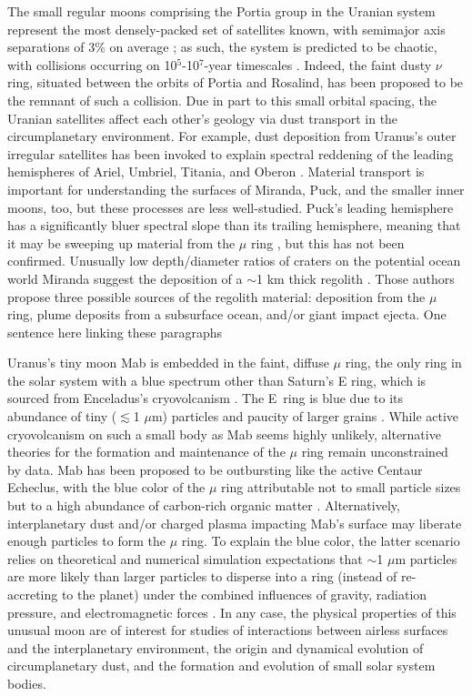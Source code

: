 \documentclass[preprint]{aastex631}
\begin{document}
The small regular moons comprising the Portia group in the Uranian system represent the most densely-packed set of satellites known, with semimajor axis separations of 3\% on average \citep{showalter20}; as such, the system is predicted to be chaotic, with collisions occurring on 10$^5$-10$^7$-year timescales \citep{duncan97, french12}. Indeed, the faint dusty $\nu$ ring, situated between the orbits of Portia and Rosalind, has been proposed to be the remnant of such a collision. Due in part to this small orbital spacing, the Uranian satellites affect each other's geology via dust transport in the circumplanetary environment. For example, dust deposition from Uranus's outer irregular satellites has been invoked to explain spectral reddening of the leading hemispheres of Ariel, Umbriel, Titania, and Oberon \citep{cartwright18}. Material transport is important for understanding the surfaces of Miranda, Puck, and the smaller inner moons, too, but these processes are less well-studied. 
Puck's leading hemisphere has a significantly bluer spectral slope than its trailing hemisphere, meaning that it may be sweeping up material from the $\mu$ ring \citep{french17}, but this has not been confirmed. %
Unusually low depth/diameter ratios of craters on the potential ocean world Miranda suggest the deposition of a $\sim$1 km thick regolith \citep{cartwright21, beddingfield22}. Those authors propose three possible sources of the regolith material: deposition from the $\mu$ ring, plume deposits from a subsurface ocean, and/or giant impact ejecta. 
One sentence here linking these paragraphs

Uranus's tiny moon Mab is embedded in the faint, diffuse $\mu$ ring, the only ring in the solar system with a blue spectrum other than Saturn's E ring, which is sourced from Enceladus's cryovolcanism \citep{depater06}. The E~ring is blue due to its abundance of tiny ($\lesssim$1 $\mu$m) particles and paucity of larger grains \citep{showalter91, depater04, hillier07}. While active cryovolcanism on such a small body as Mab seems highly unlikely, alternative theories for the formation and maintenance of the $\mu$ ring remain unconstrained by data. Mab has been proposed to be outbursting like the active Centaur Echeclus, with the blue color of the $\mu$ ring attributable not to small particle sizes but to a high abundance of carbon-rich organic matter \citep{seccull19}. Alternatively, interplanetary dust and/or charged plasma impacting Mab's surface may liberate enough particles to form the $\mu$ ring. To explain the blue color, the latter scenario relies on theoretical and numerical simulation expectations that $\sim$1 $\mu$m particles are more likely than larger particles to disperse into a ring (instead of re-accreting to the planet) under the combined influences of gravity, radiation pressure, and electromagnetic forces \citep{horanyi92, sfair09, sfair12}. In any case, the physical properties of this unusual moon are of interest for studies of interactions between airless surfaces and the interplanetary environment, the origin and dynamical evolution of circumplanetary dust, and the formation and evolution of small solar system bodies.
\end{document}
